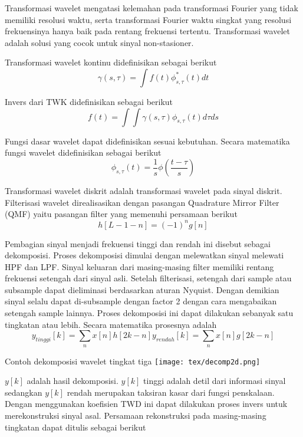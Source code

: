 \documentclass[laporan.tex]{subfiles}
\begin{document}
Transformasi wavelet mengatasi kelemahan pada transformasi Fourier yang tidak memiliki resolusi waktu, serta transformasi Fourier waktu singkat yang resolusi frekuensinya hanya baik pada rentang frekuensi tertentu. Transformasi wavelet adalah solusi yang cocok untuk sinyal non-stasioner.

Transformasi wavelet kontinu didefinisikan sebagai berikut
\begin{equation}
\gamma(s, \tau) = \int f(t) \phi^{*}_{s,\tau}(t)dt
\end{equation}

Invers dari TWK didefinisikan sebagai berikut
\begin{equation}
f(t) = \int \int \gamma(s,\tau)\phi_{s,\tau}(t)d {\tau}ds
\end{equation}

Fungsi dasar wavelet dapat didefinisikan sesuai kebutuhan. Secara matematika fungsi wavelet didefinisikan sebagai berikut
\begin{equation}
\phi_{s,\tau}(t) = \frac{1}{s}\phi(\frac{t-\tau}{s})
\end{equation}

Transformasi wavelet diskrit adalah transformasi wavelet pada sinyal diskrit. Filterisasi wavelet direalisasikan dengan pasangan Quadrature Mirror Filter (QMF) yaitu pasangan filter yang memenuhi persamaan berikut
\begin{equation}
h[L-1-n]=(-1)^ng[n]
\end{equation}

Pembagian sinyal menjadi frekuensi tinggi dan rendah ini disebut sebagai dekomposisi. Proses dekomposisi dimulai dengan melewatkan sinyal melewati HPF dan LPF. Sinyal keluaran dari masing-masing filter memiliki rentang frekuensi setengah dari sinyal asli. Setelah filterisasi, setengah dari sample atau subsample dapat dieliminasi berdasarkan aturan Nyquist. Dengan demikian sinyal selalu dapat di-subsample dengan factor 2 dengan cara mengabaikan setengah sample lainnya. Proses dekomposisi ini dapat dilakukan sebanyak satu tingkatan atau lebih. Secara matematika prosesnya adalah
\begin{equation}
y_{tinggi}[k]=\sum_n x[n]h[2k-n]
y_{rendah}[k]=\sum_n x[n]g[2k-n]
\end{equation}

Contoh dekomposisi wavelet tingkat tiga
\texttt{[image: tex/decomp2d.png]}

$y[k]$ adalah hasil dekomposisi. $y[k]$ tinggi adalah detil dari informasi sinyal sedangkan $y[k]$ rendah merupakan taksiran kasar dari fungsi penskalaan. Dengan menggunakan koefisien TWD ini dapat dilakukan proses invers untuk merekonstruksi sinyal asal. Persamaan rekonstruksi pada masing-masing tingkatan dapat ditulis sebagai berikut
\end{document}
